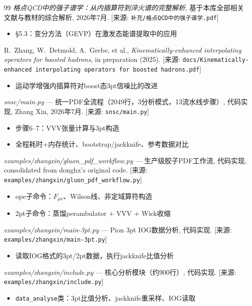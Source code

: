 \documentclass[12pt,a4paper]{ctexart}
\theoremstyle{definition}
\begin{document}
\begin{thebibliography}{99}
\textit{格点QCD中的强子谱学：从内插算符到淬火谱的完整解析},
基于本库全部相关文献与教材的综合解析, 2026年7月.
[来源: \texttt{补充/格点QCD中的强子谱学.pdf}]
\begin{itemize}
    \item §5.3：变分方法（GEVP）在激发态能谱提取中的应用
\end{itemize}

R.~Zhang, W.~Detmold, A.~Grebe, et al.,
\textit{Kinematically-enhanced interpolating operators for boosted hadrons},
in preparation (2025).
[来源: \texttt{docs/Kinematically-enhanced interpolating operators for boosted hadrons.pdf}]
\begin{itemize}
    \item 运动学增强内插算符对boost态3pt信噪比的改进
\end{itemize}

\textit{snsc/main.py} — 统一PDF全流程（2049行，3分析模式，13流水线步骤）,
代码实现, Zhang Xin, 2026年7月.
[来源: \texttt{snsc/main.py}]
\begin{itemize}
    \item 步骤6--7：VVV张量计算与3pt构造
    \item 全程耗时+内存统计、bootstrap/jackknife、参考数据对比
\end{itemize}

\textit{examples/zhangxin/gluon\_pdf\_workflow.py} — 生产级胶子PDF工作流,
代码实现, consolidated from donghx's original code.
[来源: \texttt{examples/zhangxin/gluon\_pdf\_workflow.py}]
\begin{itemize}
    \item ope子命令：$F_{\mu\nu}$、Wilson线、非定域算符构造
    \item 2pt子命令：蒸馏perambulator + VVV + Wick收缩
\end{itemize}

\textit{examples/zhangxin/main-3pt.py} — Pion 3pt IOG数据分析,
代码实现.
[来源: \texttt{examples/zhangxin/main-3pt.py}]
\begin{itemize}
    \item 读取IOG格式的3pt/2pt数据，执行jackknife比值分析
\end{itemize}

\textit{examples/zhangxin/include.py} — 核心分析模块（约900行）,
代码实现.
[来源: \texttt{examples/zhangxin/include.py}]
\begin{itemize}
    \item \texttt{data\_analyse}类：3pt比值分析、jackknife重采样、IOG读取
\end{itemize}

\end{thebibliography}
\end{document}
